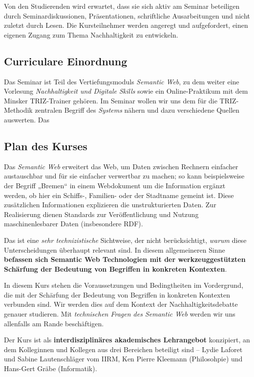 \documentclass[11pt,a4paper]{article}
\begin{document}
Von den Studierenden wird erwartet, dass sie sich aktiv am Seminar beteiligen
durch Seminardiskussionen, Präsentationen, schriftliche Ausarbeitungen und
nicht zuletzt durch Lesen. Die Kursteilnehmer werden angeregt und
aufgefordert, einen eigenen Zugang zum Thema Nachhaltigkeit zu entwickeln.

\subsection{Curriculare Einordnung}

Das Seminar ist Teil des Vertiefungsmoduls \emph{Semantic Web}, zu dem weiter
eine Vorlesung \emph{Nachhaltigkeit und Digitale Skills} sowie ein
Online-Praktikum mit dem Minsker TRIZ-Trainer gehören. Im Seminar wollen wir
uns dem für die TRIZ-Methodik zentralen Begriff des \emph{Systems} nähern und
dazu verschiedene Quellen auswerten. Das

\subsection{Plan des Kurses}

Das \emph{Semantic Web} erweitert das Web, um Daten zwischen Rechnern
einfacher austauschbar und für sie einfacher verwertbar zu machen; so kann
beispielsweise der Begriff „Bremen“ in einem Webdokument um die Information
ergänzt werden, ob hier ein Schiffs-, Familien- oder der Stadtname gemeint
ist. Diese zusätzlichen Informationen explizieren die unstrukturierten
Daten. Zur Realisierung dienen Standards zur Veröffentlichung und Nutzung
maschinenlesbarer Daten (insbesondere RDF).

Das ist eine \emph{sehr technizistische} Sichtweise, der nicht
berücksichtigt, \emph{warum} diese Unterscheidungen überhaupt relevant
sind. In diesem allgemeineren Sinne \textbf{befassen sich Semantic Web
Technologien mit der werkzeuggestützten Schärfung der Bedeutung von
Begriffen in konkreten Kontexten}.

In diesem Kurs stehen die Voraussetzungen und Bedingtheiten im Vordergrund,
die mit der Schärfung der Bedeutung von Begriffen in konkreten Kontexten
verbunden sind. Wir werden dies auf dem Kontext der Nachhaltigkeitsdebatte
genauer studieren. Mit \emph{technischen Fragen des Semantic Web} werden wir
uns allenfalls am Rande beschäftigen.

Der Kurs ist als \textbf{interdisziplinäres akademisches Lehrangebot}
konzipiert, an dem Kolleginnen und Kollegen aus drei Bereichen beteiligt sind
-- Lydie Laforet und Sabine Lautenschläger vom IIRM, Ken Pierre Kleemann
(Philosohpie) und Hans-Gert Gräbe (Informatik).
\end{document}
